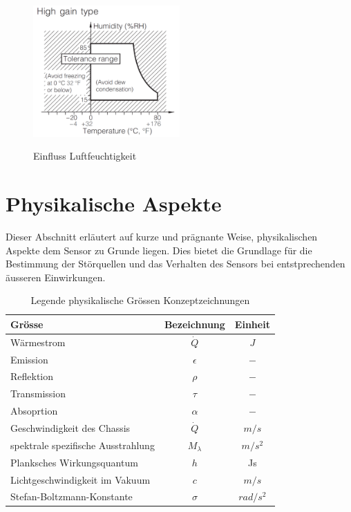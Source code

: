 \begin{figure}[H]
	\centering
	\includegraphics[width=0.5\textwidth]
	{fig/Humidity_Tolerance.PNG}
	\caption[Einfluss Luftfeuchtigkeit]{Einfluss Luftfeuchtigkeit} \protect\cite{AMG8834}
	\label{fig:Humidity}
\end{figure}


\section{Physikalische Aspekte}

Dieser Abschnitt erläutert auf kurze und prägnante Weise, physikalischen Aspekte dem Sensor zu Grunde liegen. Dies bietet die Grundlage für die Bestimmung der Störquellen und das Verhalten des Sensors bei entstprechenden äusseren Einwirkungen. 



\begin{table}[H]
	\begin{tabular}{l|c|c}
		
		\rowcolor{gray} Grösse &  Bezeichnung  & Einheit \\
		\hline 
		Wärmestrom &  $\dot{Q}$ & $J$  \\ 
		\rowcolor{gray}Emission & $\epsilon$ & $-$\\	
		Reflektion &  $\rho $ & $-$ \\
		\rowcolor{gray} Transmission & $\tau$ & $-$\\
		Absoprtion &  $\alpha$ & $-$  \\ 
		
		\rowcolor{gray}Geschwindigkeit des Chassis & $\dot{Q}$ & $m/s$\\
		spektrale spezifische Ausstrahlung &  $M_{\lambda }$ & $m/s^2$ \\
		\rowcolor{gray} Planksches Wirkungsquantum &  $ h$ & Js \\ 
		Lichtgeschwindigkeit im Vakuum & $c $ & $ m/s$ \\ 
		\rowcolor{gray} Stefan-Boltzmann-Konstante & $\sigma$ & $ rad/s^2 $ \\ 
	\end{tabular}
	\caption{Legende physikalische Grössen Konzeptzeichnungen}
	\label{tab:Legende Physikalische Grössen} 
\end{table} 


